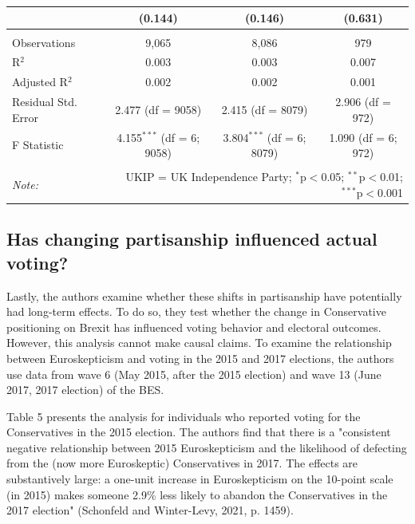 \documentclass[12pt,letterpaper]{article}
\begin{document}
\begin{table}[H]
\begin{tabular}{@{\extracolsep{3pt}}lccc}
			& (0.144) & (0.146) & (0.631) \\ 
			\hline \\[-1.8ex] 
			Observations & 9,065 & 8,086 & 979 \\ 
			R$^{2}$ & 0.003 & 0.003 & 0.007 \\ 
			Adjusted R$^{2}$ & 0.002 & 0.002 & 0.001 \\ 
			Residual Std. Error & 2.477 (df = 9058) & 2.415 (df = 8079) & 2.906 (df = 972) \\ 
			F Statistic & 4.155$^{***}$ (df = 6; 9058) & 3.804$^{***}$ (df = 6; 8079) & 1.090 (df = 6; 972) \\ 
			\hline 
			\hline \\[-1.8ex] 
			\textit{Note:}  & \multicolumn{3}{r}{UKIP = UK Independence Party; $^{*}$p$<$0.05; $^{**}$p$<$0.01; $^{***}$p$<$0.001} \\ 
		\end{tabular} 
	\end{table} 
	
	\subsection{Has changing partisanship influenced actual voting?}
	Lastly, the authors examine whether these shifts in partisanship have potentially had long-term effects. To do so, they test whether the change in Conservative positioning on Brexit has influenced voting behavior and electoral outcomes. However, this analysis cannot make causal claims. To examine the relationship between Euroskepticism and voting in the 2015 and 2017 elections, the authors use data from wave 6 (May 2015, after the 2015 election) and wave 13 (June 2017, 2017 election) of the BES.
	
	Table 5 presents the analysis for individuals who reported voting for the Conservatives in the 2015 election. The authors find that there is a "consistent negative relationship between 2015 Euroskepticism and the likelihood of defecting from the (now more Euroskeptic) Conservatives in 2017. The effects are substantively large: a one-unit increase in Euroskepticism on the 10-point scale (in 2015) makes someone 2.9\% less likely to abandon the Conservatives in the 2017 election" (Schonfeld and Winter-Levy, 2021, p. 1459).
	
\end{document}
